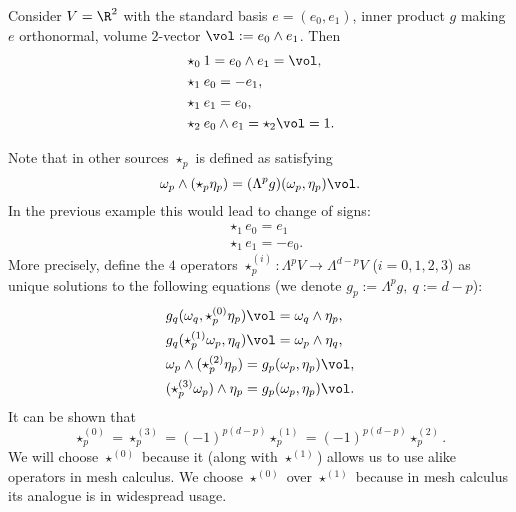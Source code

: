 \begin{example}
  Consider
    $V = \R^2$ with the standard basis $e = (e_0, e_1)$,
    inner product $g$ making $e$ orthonormal,
    volume $2$-vector $\vol := e_0 \wedge e_1$.
  Then
  \begin{subequations}
    \begin{align}
      & \star_0 1 = e_0 \wedge e_1 = \vol, \\
      & \star_1 e_0 = - e_1, \\
      & \star_1 e_1 = e_0, \\
      & \star_2 e_0 \wedge e_1 = \star_2 \vol = 1.
    \end{align}
  \end{subequations}
\end{example}
\begin{remark}
  Note that in other sources $\star_p$ is defined as satisfying
  \begin{equation}
    \omega_p \wedge (\star_p \eta_p) = (\Lambda^p g)(\omega_p, \eta_p) \vol.
  \end{equation}
  In the previous example this would lead to change of signs:
  \begin{subequations}
    \begin{align}
      & \star_1 e_0 = e_1 \\
      & \star_1 e_1 = - e_0.
    \end{align}
  \end{subequations}
  More precisely, define the $4$ operators
  $\star^{(i)}_p \colon \Lambda^p V \to \Lambda^{d - p} V$ ($i = 0, 1, 2, 3$)
  as unique solutions to the following equations
  (we denote $g_p := \Lambda^p g,\ q := d - p$):
  \begin{subequations}
    \begin{align}
      & g_q(\omega_q, \star^{(0)}_p \eta_p) \vol = \omega_q \wedge \eta_p, \\
      & g_q(\star^{(1)}_p \omega_p, \eta_q) \vol = \omega_p \wedge \eta_q, \\
      & \omega_p \wedge (\star^{(2)}_p \eta_p) = g_p(\omega_p, \eta_p) \vol, \\
      & (\star^{(3)}_p \omega_p) \wedge \eta_p = g_p(\omega_p, \eta_p) \vol.
    \end{align}
  \end{subequations}
  It can be shown that
  \begin{equation}
    \star^{(0)}_p
    = \star^{(3)}_p
    = (-1)^{p (d - p)} \star^{(1)}_p
    = (-1)^{p (d - p)} \star^{(2)}_p.
  \end{equation}
  We will choose $\star^{(0)}$ because it (along with $\star^{(1)}$) allows us
  to use alike operators in mesh calculus.
  We choose $\star^{(0)}$ over $\star^{(1)}$ because in mesh calculus its
  analogue is in widespread usage.
\end{remark}
